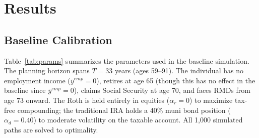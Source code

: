 \documentclass[12pt]{article}
\begin{document}
\section{Results}
\label{sec:results}

\subsection{Baseline Calibration}

Table~\ref{tab:params} summarizes the parameters used in the baseline
simulation. The planning horizon spans $T = 33$ years (ages 59--91).
The individual has no employment income ($\bar{y}^{emp} = 0$), retires at
age 65 (though this has no effect in the baseline since $\bar{y}^{emp} = 0$),
claims Social Security at age 70, and faces RMDs from age 73 onward.
The Roth is held entirely in equities ($\alpha_r = 0$) to maximize
tax-free compounding; the traditional IRA holds a 40\% muni bond position
($\alpha_d = 0.40$) to moderate volatility on the taxable account.
All 1,000 simulated paths are solved to optimality.
\end{document}
